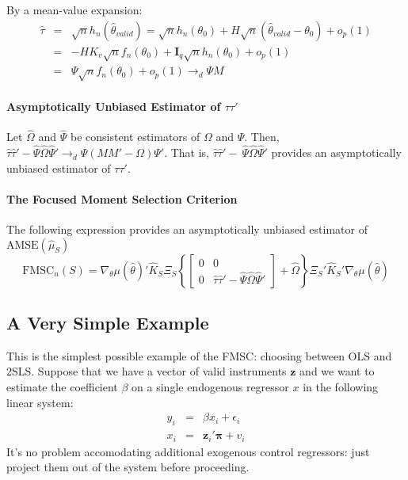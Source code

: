\documentclass[12pt]{article}
\theoremstyle{definition}
\begin{document}
By a mean-value expansion:
	\begin{eqnarray*}
	\widehat{\tau} &=& \sqrt{n} h_n\left(\widehat{\theta}_{valid}\right) = \sqrt{n}h_n(\theta_0) + H \sqrt{n}\left(\widehat{\theta}_{valid} - \theta_0\right) + o_p(1)\\
		&=&-HK_{v} \sqrt{n}f_n(\theta_0) + \mathbf{I}_q\sqrt{n}h_n(\theta_0) +o_p(1)\\
		&=& \Psi \sqrt{n}f_n(\theta_0) + o_p(1) \rightarrow_d\Psi M
\end{eqnarray*}

\paragraph{Asymptotically Unbiased Estimator of $\tau\tau'$}
Let $\widehat{\Omega}$ and $\widehat{\Psi}$ be consistent estimators of $\Omega$ and $\Psi$. Then, $ \widehat{\tau}\widehat{\tau}' - \widehat{\Psi}\widehat{\Omega}\widehat{\Psi}' \rightarrow_d\Psi \left(MM' - \Omega\right)\Psi' $. That is, $\widehat{\tau}\widehat{\tau}' - \ \widehat{\Psi}\widehat{\Omega}\widehat{\Psi}' $ provides an asymptotically unbiased estimator of $\tau\tau'$.

\paragraph{The Focused Moment Selection Criterion} The following expression provides an asymptotically unbiased estimator of $\mbox{AMSE}(\widehat{\mu}_S)$
$$\mbox{FMSC}_n(S) = \nabla_\theta\mu(\widehat{\theta})'\widehat{K}_S\Xi_S \left\{\left[\begin{array}{cc}0&0\\0&\widehat{\tau}\widehat{\tau}' - \widehat{\Psi}\widehat{\Omega}\widehat{\Psi}'\end{array}\right] + \widehat{\Omega}\right\}\Xi_S'\widehat{K}_S' \nabla_\theta\mu(\widehat{\theta})$$

\subsection{A Very Simple Example}
This is the simplest possible example of the FMSC: choosing between OLS and 2SLS. Suppose that we have a vector of valid instruments $\mathbf{z}$ and we want to estimate the coefficient $\beta$ on a single endogenous regressor $x$ in the following linear system:
    	\begin{eqnarray*}
			y_{i} &=& \beta x_{i}  + \epsilon_{i}\\
	x_{i} &=& \mathbf{z}_{i}' \boldsymbol{\pi} + v_{i}
		\end{eqnarray*}
It's no problem accomodating additional exogenous control regressors: just project them out of the system before proceeding. 
\end{document}
